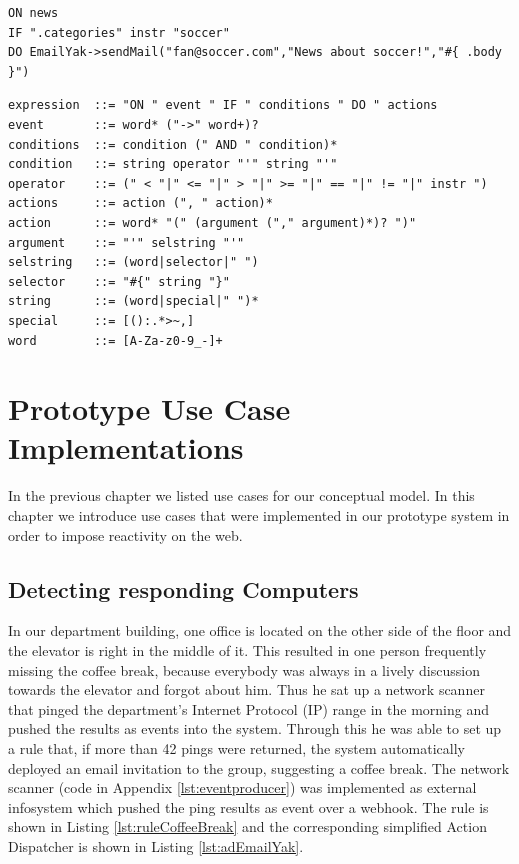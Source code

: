 \begin{lstlisting}[float=h,language=OwnRule,label={lst:exampleRulePhrase},caption=Example Phrase in Prototype Rule Language]
ON news
IF ".categories" instr "soccer"
DO EmailYak->sendMail("fan@soccer.com","News about soccer!","#{ .body }")
\end{lstlisting}

\begin{lstlisting}[float=h,language=OwnRule,label={lst:backusnaur},caption={Extended Backus-Naur Form of Prototype Rule Language Syntax}]
expression  ::= "ON " event " IF " conditions " DO " actions
event       ::= word* ("->" word+)?
conditions  ::= condition (" AND " condition)*
condition   ::= string operator "'" string "'"
operator    ::= (" < "|" <= "|" > "|" >= "|" == "|" != "|" instr ")
actions     ::= action (", " action)*
action      ::= word* "(" (argument ("," argument)*)? ")"
argument    ::= "'" selstring "'"
selstring   ::= (word|selector|" ")
selector    ::= "#{" string "}"
string      ::= (word|special|" ")*
special     ::= [():.*>~,]
word        ::= [A-Za-z0-9_-]+
\end{lstlisting}



\section{Prototype Use Case Implementations}
In the previous chapter we listed use cases for our conceptual model.
In this chapter we introduce use cases that were implemented in our prototype system in order to impose reactivity on the \textrm{\gls{web}}.


\subsection{Detecting responding Computers}
In our department building, one office is located on the other side of the floor and the elevator is right in the middle of it.
This resulted in one person frequently missing the coffee break, because everybody was always in a lively discussion towards the elevator and forgot about him.
Thus he sat up a network scanner that pinged the department's \textrm{Internet Protocol (IP)} range in the morning and pushed the results as events into the system.
Through this he was able to set up a rule that, if more than 42 pings were returned, the system automatically deployed an email invitation to the group, suggesting a coffee break.
The network scanner (code in Appendix \ref{lst:eventproducer}) was implemented as external \textrm{\gls{infosystem}} which pushed the ping results as event over a \textrm{\gls{webhook}}.
The rule is shown in Listing \ref{lst:ruleCoffeeBreak} and the corresponding simplified \textrm{Action Dispatcher} is shown in Listing \ref{lst:adEmailYak}.

